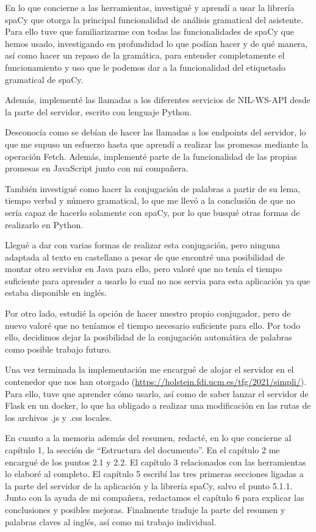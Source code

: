 En lo que concierne a las herramientas, investigué y aprendí a usar la librería spaCy que otorga la principal funcionalidad de análisis gramatical del asistente. Para ello tuve que familiarizarme con todas las funcionalidades de spaCy que hemos usado, investigando en profundidad lo que podían hacer y de qué manera, así como hacer un repaso de la gramática, para entender completamente el funcionamiento y uso que le podemos dar a la funcionalidad del etiquetado gramatical de spaCy.


Además, implementé las llamadas a los diferentes servicios de NIL-WS-API desde la parte del servidor, escrito con lenguaje Python.

Desconocía como se debían de hacer las llamadas a los endpoints del servidor, lo que me supuso un esfuerzo hasta que aprendí a realizar las promesas mediante la operación Fetch. Además, implementé parte de la funcionalidad de las propias promesas en JavaScript junto con mi compañera.

También investigué como hacer la conjugación de palabras a partir de su lema, tiempo verbal y número gramatical, lo que me llevó a la conclusión de que no sería capaz de hacerlo solamente con spaCy, por lo que busqué otras formas de realizarlo en Python. 

Llegué a dar con varias formas de realizar esta conjugación, pero ninguna adaptada al texto en castellano a pesar de que encontré una posibilidad de montar otro servidor en Java para ello, pero valoré que no tenía el tiempo suficiente para aprender a usarlo lo cual no nos servia para esta aplicación ya que estaba disponible en inglés. 

Por otro lado, estudié la opción de hacer nuestro propio conjugador, pero de nuevo valoré que no teníamos el tiempo necesario suficiente para ello. Por todo ello, decidimos dejar la posibilidad de la conjugación automática de palabras como posible trabajo futuro. 


Una vez terminada la implementación me encargué de alojar el servidor en el contenedor que nos han otorgado (\url{https://holstein.fdi.ucm.es/tfg/2021/simpli/}). Para ello, tuve que aprender cómo usarlo, así como de saber lanzar el servidor de Flask en un docker, lo que ha obligado a realizar una modificación en las rutas de los archivos .js y .css locales.

En cuanto a la memoria además del resumen, redacté, en lo que concierne al capítulo 1, la sección de ``Estructura del documento''. En el capítulo 2  me encargué de los puntos 2.1 y 2.2. El capítulo 3 relacionados con las herramientas lo elaboré al completo. El capítulo 5 escribí las tres primeras secciones ligadas a la parte del servidor de la aplicación y la librería spaCy, salvo el punto 5.1.1. Junto con la ayuda de mi compañera, redactamos el capítulo 6 para explicar las conclusiones y posibles mejoras. Finalmente traduje la parte del resumen y palabras claves al inglés, así como mi trabajo individual.




